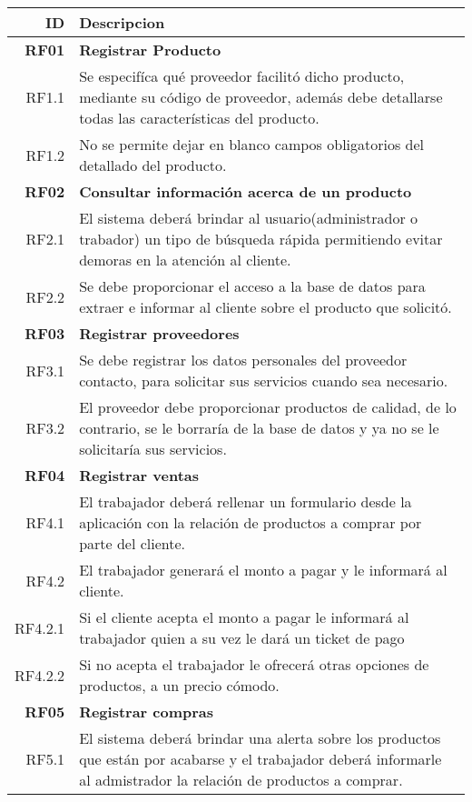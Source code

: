 \documentclass[a4paper,11pt, spanish]{report}
\begin{document}
{{{{{{{{{{{  {\renewcommand{\arraystretch}{1}%
    \begin{longtable}{r|p{4.1in}}
          \textbf{\Large ID} & \textbf{\Large Descripcion}\\ \hline
      \textbf{\large RF01} & \textbf{\large Registrar Producto} \\ 
      RF1.1 & Se especifíca qué proveedor facilitó dicho producto, mediante su código de proveedor, además debe detallarse todas las características del producto.\\
      RF1.2 & No se permite dejar en blanco campos obligatorios del detallado del producto. \\ \hline
      \textbf{\large RF02} & \textbf{\large Consultar información acerca de un producto} \\
      RF2.1 & El sistema deberá brindar al usuario(administrador o trabador) un tipo de búsqueda rápida permitiendo evitar demoras en la atención al cliente. \\
      RF2.2 & Se debe proporcionar el acceso a la base de datos para extraer e informar al cliente sobre el producto que solicitó. \\ \hline
      \textbf{\large RF03} & \textbf{\large Registrar proveedores} \\
      RF3.1 & Se debe registrar los datos personales del proveedor contacto, para solicitar sus servicios cuando sea necesario. \\
      RF3.2 & El proveedor debe proporcionar productos de calidad, de lo contrario, se le borraría de la base de datos y ya no se le solicitaría sus servicios.\\ \hline
      \textbf{\large RF04} & \textbf{\large Registrar ventas} \\
      RF4.1 & El trabajador deberá rellenar un formulario desde la aplicación con la relación de productos a comprar por parte del cliente.\\
      RF4.2 & El trabajador generará el monto a pagar y le informará al cliente.\\
      RF4.2.1 & Si el cliente acepta el monto a pagar le informará al trabajador quien a su vez le dará un ticket de pago\\
      RF4.2.2 & Si no acepta el trabajador le ofrecerá otras  opciones de productos, a un precio cómodo. \\ \hline
      \textbf{\large RF05} & \textbf{\large Registrar compras} \\
      RF5.1 & El sistema deberá brindar una alerta sobre los productos que están por acabarse y el trabajador deberá informarle al admistrador la relación de productos a comprar. \\

\end{longtable}}}}}}}}}}}}}
\end{document}
